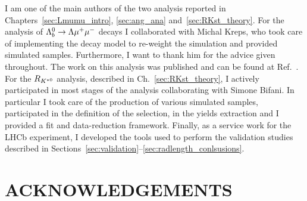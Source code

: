 I am one of the main authors of the two analysis reported in Chapters~\ref{sec:Lmumu_intro},
\ref{sec:ang_ana} and~\ref{sec:RKst_theory}. For the analysis 
of $\Lambda^0_b\rightarrow\Lambda\mu^+\mu^-$ decays I collaborated with Michal Kreps, who took care of implementing the decay
model to re-weight the simulation and provided simulated samples. 
Furthermore, I want to thank him for the advice given throughout. 
The work on this analysis was published and can be found at Ref.~\cite{Aaij:2015xza}.
For the $R_{K^{*0}}$ analysis, described in Ch.~\ref{sec:RKst_theory}, I actively participated
in most stages of the analysis collaborating with Simone Bifani. In particular I took care of
the production of various simulated samples, participated in the definition of the selection,
in the yields extraction and I provided a fit and data-reduction framework.
Finally, as a service work for the LHCb experiment, I developed the tools used to perform
the validation studies described in Sections~\ref{sec:validation}--\ref{sec:radlength_conlsusions}.

\clearpage
\chapter*{ACKNOWLEDGEMENTS}

